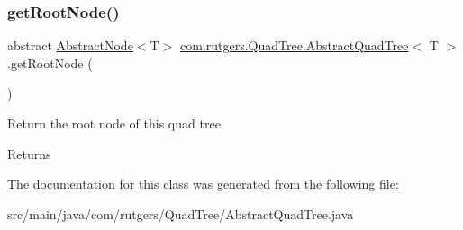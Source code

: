 \subsubsection{\texorpdfstring{get\+Root\+Node()}{getRootNode()}}
{\footnotesize\ttfamily abstract \hyperlink{classcom_1_1rutgers_1_1QuadTree_1_1AbstractNode}{Abstract\+Node}$<$T$>$ \hyperlink{classcom_1_1rutgers_1_1QuadTree_1_1AbstractQuadTree}{com.\+rutgers.\+Quad\+Tree.\+Abstract\+Quad\+Tree}$<$ T $>$.get\+Root\+Node (\begin{DoxyParamCaption}{ }\end{DoxyParamCaption})\hspace{0.3cm}{\ttfamily [abstract]}}

Return the root node of this quad tree

\begin{DoxyReturn}{Returns}

\end{DoxyReturn}


The documentation for this class was generated from the following file\+:\begin{DoxyCompactItemize}
\item 
src/main/java/com/rutgers/\+Quad\+Tree/Abstract\+Quad\+Tree.\+java\end{DoxyCompactItemize}
